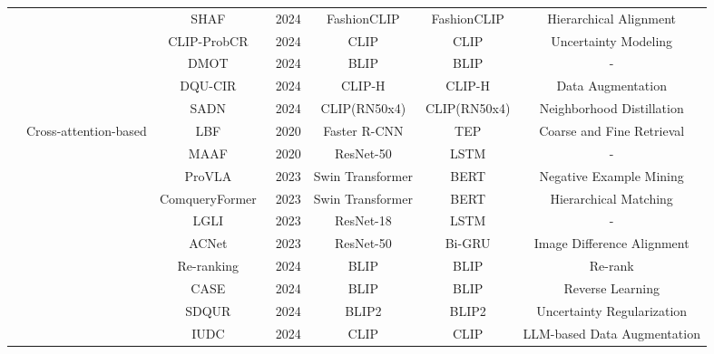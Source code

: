 \begin{table*}
{\begin{tabular}{|c|c|c|c|cc|c|}
&  & SHAF~\cite{yan2024shaf} & 2024 & FashionCLIP & FashionCLIP & Hierarchical Alignment \\ \cline{3-7}
&  & CLIP-ProbCR~\cite{li2024clip} & 2024 & CLIP & CLIP & Uncertainty Modeling \\ \cline{3-7}
&  & DMOT~\cite{dmot} & 2024 & BLIP & BLIP & - \\ \cline{3-7}
&  & DQU-CIR~\cite{wen2024dqu} & 2024 & CLIP-H & CLIP-H & Data Augmentation \\ \cline{3-7}
&  & SADN~\cite{wang2024sadn} & 2024 & CLIP(RN50x4) & CLIP(RN50x4) & Neighborhood Distillation \\ \cline{2-7}

& \multirow{10}{*}{Cross-attention-based} & LBF~\cite{hosseinzadeh2020lbf} & 2020 & Faster R-CNN & TEP & Coarse and Fine Retrieval \\ \cline{3-7}
&  & MAAF~\cite{dodds2020maaf} & 2020 & ResNet-50 & LSTM &- \\ \cline{3-7}
&  & ProVLA~\cite{hu2023provla} & 2023 & Swin Transformer& BERT & Negative Example Mining \\ \cline{3-7}
&  & ComqueryFormer~\cite{xu2023ComqueryFormer} & 2023 & Swin Transformer & BERT & Hierarchical Matching \\ \cline{3-7}
&  & LGLI~\cite{huang2023lgli} & 2023 & ResNet-18 & LSTM & - \\ \cline{3-7}
&  & ACNet~\cite{li2023acnet} & 2023 & ResNet-50 & Bi-GRU & Image Difference Alignment \\ \cline{3-7}
&  & Re-ranking~\cite{liu2023rerank} & 2024 & BLIP & BLIP & Re-rank \\ \cline{3-7}
&  & CASE~\cite{levy2024case} & 2024 & BLIP & BLIP & Reverse Learning\\ \cline{3-7}
&  & SDQUR~\cite{xu2024SDQUR} & 2024 & BLIP2 & BLIP2 & Uncertainty Regularization \\ \cline{3-7}
&  & IUDC~\cite{ge2024iudc} & 2024 & CLIP & CLIP & LLM-based Data Augmentation \\ \cline{2-7}


\end{tabular}}
\end{table*}
